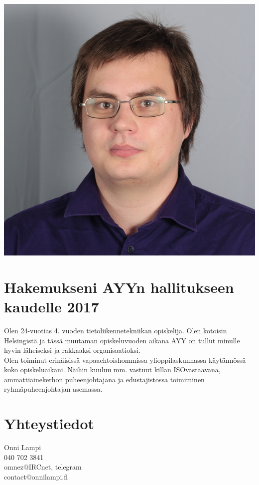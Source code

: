 \documentclass[a4paper, 12pt, finnish]{report}
\newcommand{\topic}{Hakemukseni AYYn hallitukseen kaudelle 2017}
\begin{document}
\includegraphics{Onni.jpg}
\section*{\topic}
Olen 24-vuotias 4. vuoden tietoliikennetekniikan opiskelija.
Olen kotoisin Helsingistä ja tässä muutaman opiskeluvuoden aikana AYY on tullut minulle hyvin läheiseksi ja rakkaaksi organisaatioksi.\\

Olen toiminut erinäisissä vapaaehtoishommissa ylioppilaskunnassa käytännössä koko opiskeluaikani.
Näihin kuuluu mm. vastuut killan ISOvastaavana, ammattiainekerhon puheenjohtajana ja edustajistossa toimiminen ryhmäpuheenjohtajan asemassa.


\section*{Yhteystiedot}
Onni Lampi\\
040 702 3841\\
omnez@IRCnet, telegram\\
contact@onnilampi.fi
\end{document}
